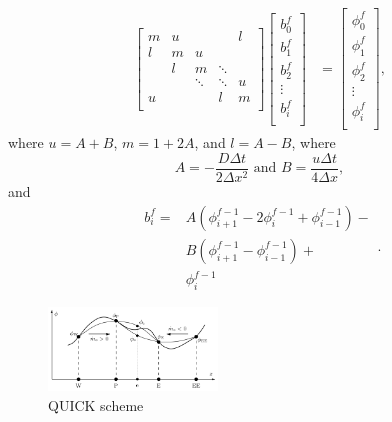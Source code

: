 \documentclass[twocolumn,10pt]{asme2ej}
\begin{document}
\begin{equation}
\begin{split}
\begin{bmatrix}
   { m } & { u } & {   }  & {   }  & { l } \\
   { l } & { m } & { u }  & {   }  & {   } \\
   {   } & { l } & { m }  & \ddots & {   } \\
   {   } & {   } & \ddots & \ddots & { u }\\
   { u } & {   } & {   }  &  { l }  & { m }\\
\end{bmatrix}
\begin{bmatrix}
   {b_0^{f} }  \\
   {b_1^{f} }  \\
   {b_2^{f} }  \\
   \vdots   \\
   {b_{i}^{f} }  \\
\end{bmatrix}
& =
\begin{bmatrix}
   {\phi_0^f }  \\
   {\phi_1^f }  \\
   {\phi_2^f }  \\
   \vdots   \\
   {\phi_{i}^f }  \\
\end{bmatrix},
\end{split}
\end{equation}
where $u = A + B$, $m = 1 + 2 A $, and $l = A - B$, where
\begin{equation}
A = -\frac{D \Delta t }{2 \Delta x^2} \mbox{ and } B = \frac{u \Delta t }{4 \Delta x},
\end{equation}
and
\begin{equation}
\begin{split}
b_i^f = & A (\phi_{i+1}^{f-1} - 2 \phi_i^{f-1} + \phi_{i-1}^{f-1}) - \\
        & B (\phi_{i+1}^{f-1} - \phi_{i-1}^{f-1}) + \\
        & \phi_i^{f-1}
\end{split}.
\end{equation}

\begin{figure}[thb]
\begin{center}
\includegraphics[width=0.4\textwidth]{figure/QUICK.png}
\caption{QUICK scheme}
\label{QUICK_scheme}
\end{center}
\end{figure}
\end{document}
